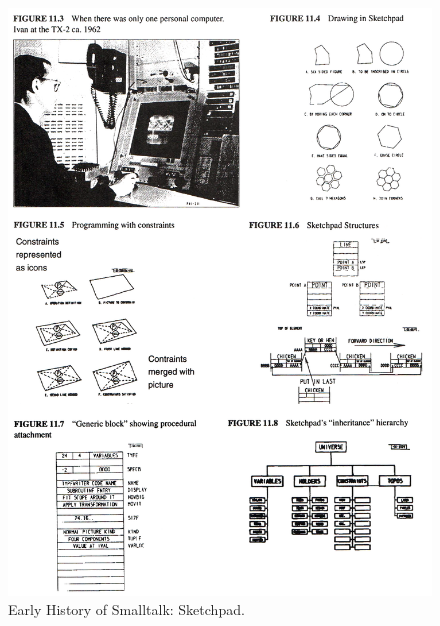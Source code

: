 \documentclass[letterpaper,12pt,parskip=full]{article}
\begin{document}
\begin{figure}[ht]
        \centering \includegraphics[scale=0.30]{SKETCHPAD.png}
        \caption{
                \label{fig:sketchpad} %
                Early History of Smalltalk: Sketchpad.
        }
\end{figure}
\end{document}
